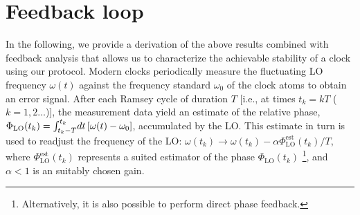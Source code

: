  




\section{Feedback loop}
In the following, we provide a derivation of the above results
combined with feedback analysis that allows us to characterize
the achievable stability of a clock using our protocol. Modern
clocks periodically measure the fluctuating LO frequency $\omega(t)$ against the
frequency standard $\omega_0$ of the clock atoms to
obtain an error signal.
After each Ramsey cycle of duration $T$ [i.e., at times $t_k=kT$
($k=1,2\hdots$)], the measurement data yield
 an estimate of the relative phase, $\Phi_\mathrm{LO}(t_k) =
\int_{t_k-T}^{t_k}\! dt\,[\omega(t) - \omega_0]$, accumulated by the LO.
This estimate in turn is used to readjust the frequency of the LO:  $\omega(t_k)
\rightarrow \omega(t_k) - \alpha\Phi^\mathrm{est}_\mathrm{LO}(t_k)/T$, where
$\Phi^\mathrm{est}_\mathrm{LO}(t_k)$ represents a suited estimator of the phase
$\Phi_\mathrm{LO}(t_k)$ \footnote{Alternatively, it is also possible to perform direct phase
feedback.}, and $\alpha < 1$ is an suitably chosen
gain.

